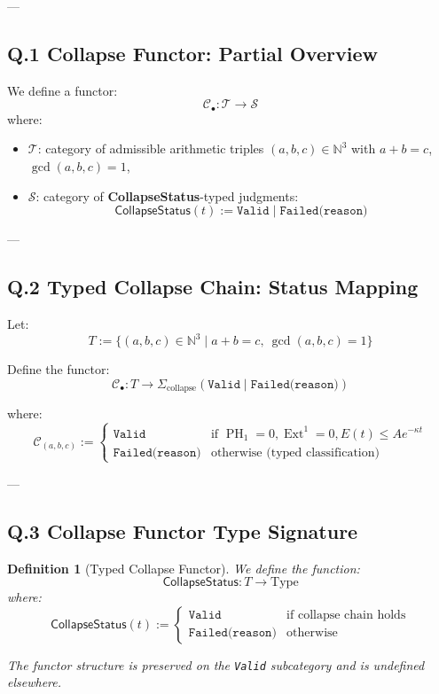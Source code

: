 \documentclass[11pt]{article}
\newtheorem{definition}[theorem]{Definition}
\DeclareMathOperator{\Ext}{Ext}
\DeclareMathOperator{\PH}{PH}
\begin{document}
---

\subsection*{Q.1 Collapse Functor: Partial Overview}

We define a functor:
\[
\mathcal{C}_\bullet : \mathcal{T} \longrightarrow \mathcal{S}
\]
where:
\begin{itemize}
  \item \( \mathcal{T} \): category of admissible arithmetic triples \( (a,b,c) \in \mathbb{N}^3 \) with \( a + b = c \), \( \gcd(a,b,c) = 1 \),
  \item \( \mathcal{S} \): category of \textbf{CollapseStatus}-typed judgments:
  \[
  \mathsf{CollapseStatus}(t) := \texttt{Valid} \;|\; \texttt{Failed(reason)}
  \]
\end{itemize}

---

\subsection*{Q.2 Typed Collapse Chain: Status Mapping}

Let:
\[
T := \{ (a,b,c) \in \mathbb{N}^3 \mid a + b = c,\ \gcd(a,b,c) = 1 \}
\]

Define the functor:
\[
\mathcal{C}_\bullet : T \to \Sigma_{\text{collapse}} \left( \texttt{Valid} \mid \texttt{Failed(reason)} \right)
\]

where:
\[
\mathcal{C}_{(a,b,c)} := 
\begin{cases}
  \texttt{Valid} & \text{if } \PH_1 = 0, \Ext^1 = 0, E(t) \leq Ae^{-\kappa t} \\
  \texttt{Failed(reason)} & \text{otherwise (typed classification)}
\end{cases}
\]

---

\subsection*{Q.3 Collapse Functor Type Signature}

\begin{definition}[Typed Collapse Functor]
We define the function:
\[
\mathsf{CollapseStatus} : T \to \mathrm{Type}
\]
where:
\[
\mathsf{CollapseStatus}(t) := 
\begin{cases}
  \texttt{Valid} & \text{if collapse chain holds} \\
  \texttt{Failed(reason)} & \text{otherwise}
\end{cases}
\]

The functor structure is preserved on the \texttt{Valid} subcategory and is undefined elsewhere.
\end{definition}
\end{document}
